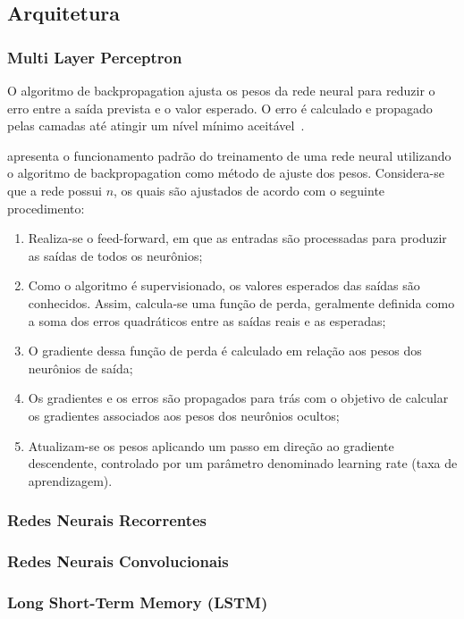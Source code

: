             
    \subsection{Arquitetura}
        \subsubsection{Multi Layer Perceptron}         
            O algoritmo de backpropagation ajusta os pesos da rede neural para reduzir o erro entre a saída prevista 
            e o valor esperado. O erro é calculado e propagado pelas camadas até atingir um nível mínimo aceitável~\cite{marangoni2010}.
            
             apresenta o funcionamento padrão do treinamento de uma rede neural utilizando o algoritmo 
            de backpropagation como método de ajuste dos pesos. Considera-se que a rede possui \( n\),  os quais são 
            ajustados de acordo com o seguinte procedimento:
            \begin{enumerate}
                \item Realiza-se o feed-forward, em que as entradas são processadas para produzir as saídas de todos os neurônios;
                \item Como o algoritmo é supervisionado, os valores esperados das saídas são conhecidos. Assim, calcula-se uma função de perda, geralmente definida como a soma dos erros quadráticos entre as saídas reais e as esperadas;
                \item O gradiente dessa função de perda é calculado em relação aos pesos dos neurônios de saída;
                \item Os gradientes e os erros são propagados para trás com o objetivo de calcular os gradientes associados aos pesos dos neurônios ocultos;
                \item Atualizam-se os pesos aplicando um passo em direção ao gradiente descendente, controlado por um parâmetro denominado learning rate (taxa de aprendizagem).
            \end{enumerate}
        \subsubsection{Redes Neurais Recorrentes}
        \subsubsection{Redes Neurais Convolucionais}
        \subsubsection{Long Short-Term Memory (LSTM)}
